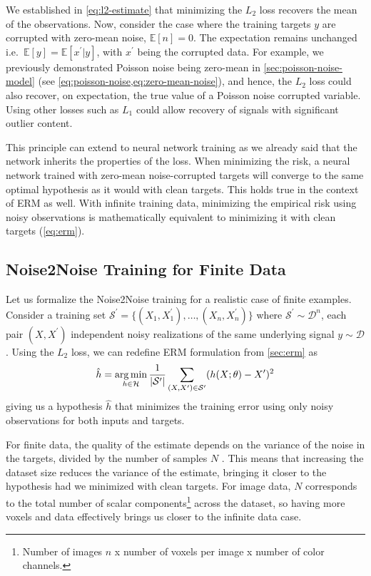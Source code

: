 We established in \cref{eq:l2-estimate} that minimizing the $L_2$ loss recovers the mean of the observations. Now, consider the case where the training targets $y$ are corrupted with zero-mean noise, $\mathbb{E}[n] = 0$. The expectation remains unchanged i.e.\ $\mathbb{E}[y] = \mathbb{E}[x^\prime|y]$, with $x^\prime$ being the corrupted data. For example, we previously demonstrated Poisson noise being zero-mean  in \cref{sec:poisson-noise-model} (see \cref{eq:poisson-noise,eq:zero-mean-noise}), and hence, the $L_2$ loss could also recover, on expectation, the true value of a Poisson noise corrupted variable. Using other losses such as $L_1$ could allow recovery of signals with significant outlier content.

This principle can extend to neural network training as we already said that the network inherits the properties of the loss. When minimizing the risk, a neural network trained with zero-mean noise-corrupted targets will converge to the same optimal hypothesis as it would with clean targets. This holds true in the context of \gls{ERM} as well. With infinite training data, minimizing the empirical risk using noisy observations is mathematically equivalent to minimizing it with clean targets (\cref{eq:erm}).

\subsection{Noise2Noise Training for Finite Data}
Let us formalize the Noise2Noise training for a realistic case of finite examples. Consider a training set $\mathcal{S}^\prime = \{(X_1, X_1^\prime), \dots, (X_n, X_n^\prime)\}$ where $\mathcal{S}^\prime \sim \mathcal{D}^n$, each pair $(X, X^\prime)$ independent noisy realizations of the same underlying signal $y \sim \mathcal{D}$. Using the $L_2$ loss, we can redefine \gls{ERM} formulation from \cref{sec:erm} as
\begin{equation}\label{eq:erm-noise2noise}
    \hat{h} = \operatorname*{arg\,min}_{h \in \mathcal{H}} \frac{1}{\lvert \mathcal{S^\prime} \rvert} \sum_{(X, X^\prime) \in \mathcal{S}^\prime} (h(X; \theta) - X^\prime)^2
\end{equation}
giving us a hypothesis $\hat{h}$ that minimizes the training error using only noisy observations for both inputs and targets.

For finite data, the quality of the estimate depends on the variance of the noise in the targets, divided by the number of samples $N$ \cite[supplementary~material]{lehtinenNoise2NoiseLearningImage2018}. This means that increasing the dataset size reduces the variance of the estimate, bringing it closer to the hypothesis had we minimized with clean targets. For image data, $N$ corresponds to the total number of scalar components\footnote{Number of images $n$ x number of voxels per image x number of color channels.} across the dataset, so having more voxels and data effectively brings us closer to the infinite data case.

